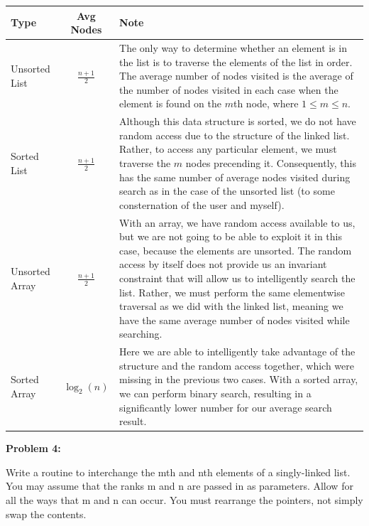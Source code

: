 \documentclass[10pt,letterpaper,final]{report}
\begin{document}
\begin{center}
  \renewcommand{\arraystretch}{1.3}
  \renewcommand{\tabularxcolumn}[1]{m{#1}}
  \begin{xltabular}{\textwidth}{|l|c|X|}
    \hline
    Type           & Avg Nodes       & Note \\ \hline
    Unsorted List  & $\frac{n+1}{2}$ &  The only way to determine whether an element is in the list is to traverse the elements of the list in order. The average number of nodes visited is the average of the number of nodes visited in each case when the element is found on the $m$th node, where $1 \le m \le n$.\\ \hline
    Sorted List    & $\frac{n+1}{2}$ & Although this data structure is sorted, we do not have random access due to the structure of the linked list. Rather, to access any particular element, we must traverse the $m$ nodes precending it. Consequently, this has the same number of average nodes visited during search as in the case of the unsorted list (to some consternation of the user and myself). \\ \hline
    Unsorted Array & $\frac{n+1}{2}$ & With an array, we have random access available to us, but we are not going to be able to exploit it in this case, because the elements are unsorted. The random access by itself does not provide us an invariant constraint that will allow us to intelligently search the list. Rather, we must perform the same elementwise traversal as we did with the linked list, meaning we have the same average number of nodes visited while searching.  \\ \hline
    Sorted Array   & $\log_2(n)$        & Here we are able to intelligently take advantage of the structure and the random access together, which were missing in the previous two cases. With a sorted array, we can perform binary search, resulting in a significantly lower number for our average search result. \\ \hline
  \end{xltabular}
\end{center}

\pagebreak

\noindent\textbf{Problem 4:}

Write a routine to interchange the mth and nth elements of a singly-linked list. You may assume that the ranks m and n are passed in as parameters. Allow for all the ways that m and n can occur. You must rearrange the pointers, not simply swap the contents.
\end{document}
